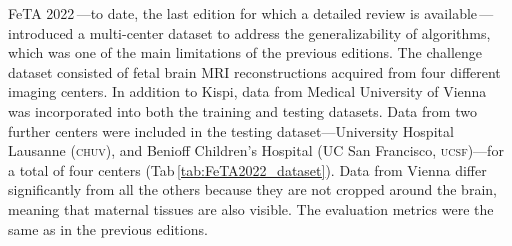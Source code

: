FeTA 2022\,\cite{FeTA2022}---to date, the last edition for which a detailed review is available\,\cite{FeTA2022_review}---introduced a multi-center dataset to address the generalizability of algorithms, which was one of the main limitations of the previous editions. The challenge dataset consisted of fetal brain MRI reconstructions acquired from four different imaging centers. In addition to Kispi, data from Medical University of Vienna was incorporated into both the training and testing datasets. Data from two further centers were included in the testing dataset---University Hospital Lausanne (\textsc{chuv}), and Benioff Children’s Hospital (UC San Francisco, \textsc{ucsf})---for a total of four centers (Tab\,\ref{tab:FeTA2022_dataset}). Data from Vienna differ significantly from all the others because they are not cropped around the brain, meaning that maternal tissues are also visible. The evaluation metrics were the same as in the previous editions.

